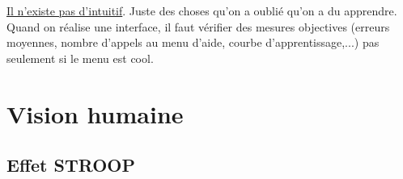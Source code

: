 \documentclass[12pt,a4paper]{article}
\begin{document}
\uline{Il n'existe pas d'intuitif}. Juste des choses qu'on a oublié qu'on a du apprendre. Quand on réalise une interface, il faut vérifier des mesures objectives (erreurs moyennes, nombre d'appels au menu d'aide, courbe d'apprentissage,...) pas seulement si le menu est cool. 

\section{Vision humaine}

\subsection{Effet STROOP}
\end{document}
